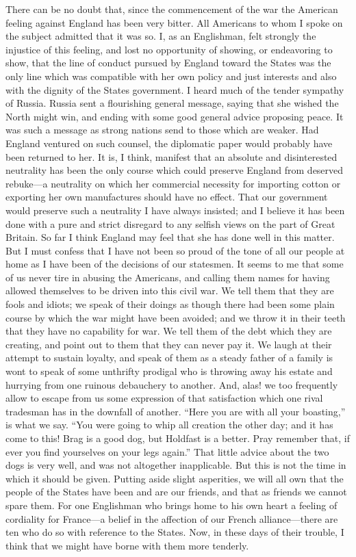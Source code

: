 There can be no doubt that, since the commencement of the war the
American feeling against England has been very bitter.  All
Americans to whom I spoke on the subject admitted that it was so.
I, as an Englishman, felt strongly the injustice of this feeling,
and lost no opportunity of showing, or endeavoring to show, that
the line of conduct pursued by England toward the States was the
only line which was compatible with her own policy and just
interests and also with the dignity of the States government.  I
heard much of the tender sympathy of Russia.  Russia sent a
flourishing general message, saying that she wished the North might
win, and ending with some good general advice proposing peace.  It
was such a message as strong nations send to those which are
weaker.  Had England ventured on such counsel, the diplomatic paper
would probably have been returned to her.  It is, I think, manifest
that an absolute and disinterested neutrality has been the only
course which could preserve England from deserved rebuke---a
neutrality on which her commercial necessity for importing cotton
or exporting her own manufactures should have no effect.  That our
government would preserve such a neutrality I have always insisted;
and I believe it has been done with a pure and strict disregard to
any selfish views on the part of Great Britain.  So far I think
England may feel that she has done well in this matter.  But I must
confess that I have not been so proud of the tone of all our people
at home as I have been of the decisions of our statesmen.  It seems
to me that some of us never tire in abusing the Americans, and
calling them names for having allowed themselves to be driven into
this civil war.  We tell them that they are fools and idiots; we
speak of their doings as though there had been some plain course by
which the war might have been avoided; and we throw it in their
teeth that they have no capability for war.  We tell them of the
debt which they are creating, and point out to them that they can
never pay it.  We laugh at their attempt to sustain loyalty, and
speak of them as a steady father of a family is wont to speak of
some unthrifty prodigal who is throwing away his estate and
hurrying from one ruinous debauchery to another.  And, alas! we too
frequently allow to escape from us some expression of that
satisfaction which one rival tradesman has in the downfall of
another.  ``Here you are with all your boasting,'' is what we say.
``You were going to whip all creation the other day; and it has come
to this!  Brag is a good dog, but Holdfast is a better.  Pray
remember that, if ever you find yourselves on your legs again.''
That little advice about the two dogs is very well, and was not
altogether inapplicable.  But this is not the time in which it
should be given.  Putting aside slight asperities, we will all own
that the people of the States have been and are our friends, and
that as friends we cannot spare them.  For one Englishman who
brings home to his own heart a feeling of cordiality for France---a
belief in the affection of our French alliance---there are ten who
do so with reference to the States.  Now, in these days of their
trouble, I think that we might have borne with them more tenderly.

